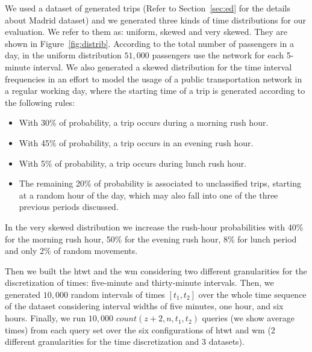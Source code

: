 	We used a dataset of generated trips  (Refer to Section~\ref{sec:ed} for the details about Madrid dataset) and we
	generated three kinds of time distributions for our evaluation. We refer to them as: uniform, skewed and very skewed. They are shown
	in Figure~\ref{fig:distrib}. 
	According to the total number of passengers in a day, in the uniform distribution $51,\!000$ passengers 
	use the network for each 5-minute interval. 
	We also generated a skewed distribution for the time interval frequencies in an effort to
	model the usage of a public transportation network in a regular working day, where the starting time of a trip
	is generated according to the following rules:
	\begin{itemize}
		\item With 30\% of probability, a trip occurs during a morning rush hour.
		\item With 45\% of probability, a trip occurs in an evening rush hour.
		\item With 5\% of probability, a trip occurs during lunch rush hour.
		\item The remaining 20\% of probability is associated to unclassified trips, starting at a random hour of the day, which may
		also fall into one of the three previous periods discussed.
	\end{itemize}
	In the very skewed distribution we increase the rush-hour probabilities with
	40\% for the morning rush hour, 50\% for the evening rush hour, 8\% for lunch period and only
	2\% of random movements.
	\medskip

	Then we built the \gls{htwt} and the \gls{wm} considering two different granularities for the discretization of times: 
	five-minute and thirty-minute intervals. Then, we generated $10,\!000$ random intervals of times $[t_1,t_2]$ over the whole 
	time sequence of the dataset considering interval widths of five minutes, one hour, and six hours.  
	Finally, we run $10,\!000$  $count(z+2,n,t_1,t_2)$ queries (we show average times) from each query set over 
	the six configurations of \gls{htwt} and \gls{wm}  
	(2 different granularities for the time discretization and 3 datasets).






